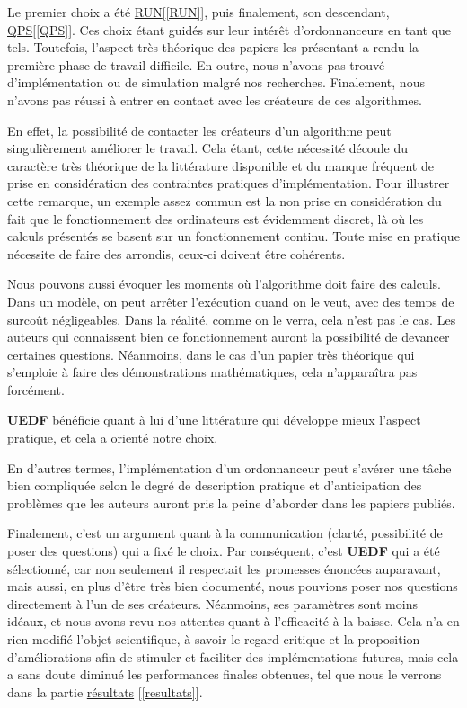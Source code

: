 	Le premier choix a été \hyperref[RUN]{RUN}[\ref*{RUN}], puis finalement, son descendant, \hyperref[QPS]{QPS}[\ref*{QPS}]. Ces choix étant guidés 
	sur leur intérêt d'ordonnanceurs en tant que tels.
	Toutefois, l'aspect très théorique des papiers les présentant a rendu la première phase de travail difficile. 
	En outre, nous n'avons pas trouvé d'implémentation ou de simulation malgré nos recherches.
	Finalement, nous n'avons pas réussi à entrer en contact avec les créateurs de ces algorithmes. \newline
	
	En effet, la possibilité de contacter les créateurs d'un algorithme peut singulièrement améliorer le 
	travail. Cela étant, cette nécessité découle du caractère très théorique de la littérature disponible
	et du manque fréquent de prise en considération des contraintes pratiques d'implémentation. 
	Pour illustrer cette remarque, un exemple assez commun est la non prise en considération 
	du fait que le fonctionnement des ordinateurs est évidemment discret, là où les 
	calculs présentés se basent sur un fonctionnement continu.
	Toute mise en pratique nécessite de faire des arrondis, ceux-ci doivent être cohérents.\newline
	
	Nous pouvons aussi évoquer les moments où l'algorithme doit faire des calculs. 
	Dans un modèle, on peut arrêter l'exécution quand on le veut, 
	avec des temps de surcoût négligeables. 	
	Dans la réalité, comme on le verra, cela 
	n'est pas le cas. 
	Les auteurs qui connaissent bien ce fonctionnement auront la possibilité de devancer certaines questions.
	Néanmoins, dans le cas d'un papier très théorique qui s'emploie à faire des démonstrations mathématiques, 
	cela n'apparaîtra pas forcément. \newline
	
	\textbf{UEDF} bénéficie quant à lui d'une littérature qui développe mieux l'aspect pratique, et cela a orienté notre choix.\newline
	
	En d'autres termes, l'implémentation d'un ordonnanceur peut s'avérer une tâche bien compliquée selon le degré de 
	description pratique et d'anticipation des problèmes que les auteurs auront pris la peine d'aborder 
	dans les papiers publiés.
	\newline
	
	
	Finalement, c'est un argument quant à la communication (clarté, possibilité de poser des questions) 
	qui a fixé le choix. Par conséquent, c'est \textbf{UEDF} qui a été sélectionné, car 
	non seulement il respectait 
	les promesses énoncées auparavant, mais aussi, en plus d'être très bien documenté, 
	nous pouvions poser nos questions directement à l'un de ses créateurs. Néanmoins, ses paramètres sont moins idéaux, 
	et nous avons revu nos attentes quant à l'efficacité à la baisse. Cela n'a en rien 
	modifié l'objet scientifique, à savoir le regard critique et la proposition d'améliorations 
	afin de stimuler et faciliter des implémentations futures, mais cela a sans doute 
	diminué les performances finales obtenues, tel que nous le verrons dans la partie \hyperref[resultats]{résultats} [\ref*{resultats}].\newline
	
